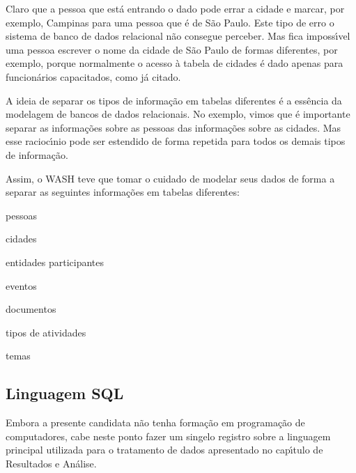 \documentclass[
12pt,		%
openright,	%
twoside,  %
a4paper,			%
chapter=TITLE,		%
english,			%
french,				%
spanish,			%
brazil				%
]{USPSC-classe/USPSC}
\begin{document}
Claro que a pessoa que est\'a entrando o dado pode errar a cidade e marcar, por exemplo, Campinas para uma pessoa que \'e de S\~ao Paulo. Este tipo de erro o sistema de banco de dados relacional n\~ao consegue perceber. Mas fica imposs\'{\i}vel uma pessoa escrever o nome da cidade de S\~ao Paulo de formas diferentes, por exemplo, porque normalmente o acesso \`a tabela de cidades \'e dado apenas para funcion\'arios capacitados, como j\'a citado.














A ideia de separar os tipos de informa\c{c}\~ao em tabelas diferentes \'e a ess\^encia da modelagem de bancos de dados relacionais. No exemplo, vimos que \'e importante separar as informa\c{c}\~oes sobre as pessoas das informa\c{c}\~oes sobre as cidades. Mas esse racioc\'{\i}nio pode ser estendido de forma repetida para todos os demais tipos de informa\c{c}\~ao.














Assim, o WASH teve que tomar o cuidado de modelar seus dados de forma a separar as seguintes informa\c{c}\~oes em tabelas diferentes:















\begin{alineas}
\item pessoas
\item cidades
\item entidades participantes
\item eventos
\item documentos
\item tipos de atividades
\item temas
\end{alineas}

\subsection[Linguagem SQL]{Linguagem SQL}\label{Linguagem SQL}
Embora a presente candidata n\~ao tenha forma\c{c}\~ao em programa\c{c}\~ao de computadores, cabe neste ponto fazer um singelo registro sobre a linguagem principal utilizada para o tratamento de dados apresentado no cap\'{\i}tulo de \textquotedbl Resultados e An\'alise\textquotedbl .
\end{document}
